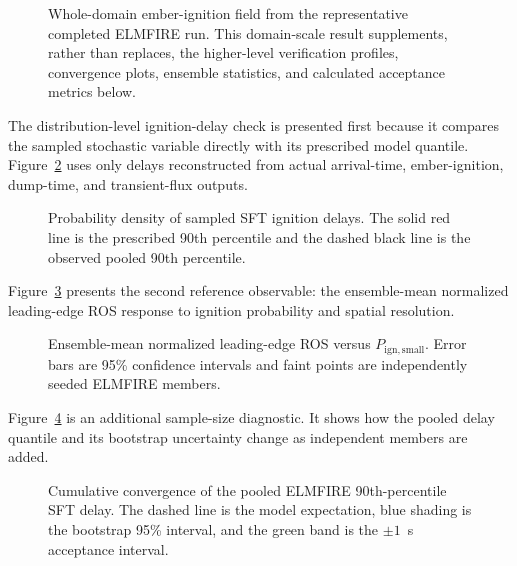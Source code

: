 \begin{figure}[H]
\centering
{}
\caption{Whole-domain ember-ignition field from the representative completed ELMFIRE run.  This
domain-scale result supplements, rather than replaces, the higher-level verification
profiles, convergence plots, ensemble statistics, and calculated acceptance metrics below.}
\label{fig:domain-result}
\end{figure}

The distribution-level ignition-delay check is presented first because it
compares the sampled stochastic variable directly with its prescribed model
quantile. Figure~\ref{fig:delay-distribution} uses only delays reconstructed
from actual arrival-time, ember-ignition, dump-time, and transient-flux outputs.

\begin{figure}[H]
\centering
{}
\caption{Probability density of sampled SFT ignition delays. The solid red line
is the prescribed 90th percentile and the dashed black line is the observed
pooled 90th percentile.}
\label{fig:delay-distribution}
\end{figure}

Figure~\ref{fig:response} presents the second reference observable: the
ensemble-mean normalized leading-edge ROS response to ignition probability and
spatial resolution.

\begin{figure}[H]
\centering
{}
\caption{Ensemble-mean normalized leading-edge ROS versus
$P_{\mathrm{ign,small}}$. Error bars are 95\% confidence intervals and faint
points are independently seeded ELMFIRE members.}
\label{fig:response}
\end{figure}

Figure~\ref{fig:delay} is an additional sample-size diagnostic. It shows how
the pooled delay quantile and its bootstrap uncertainty change as independent
members are added.

\begin{figure}[H]
\centering
{}
\caption{Cumulative convergence of the pooled ELMFIRE 90th-percentile SFT
delay. The dashed line is the model expectation, blue shading is the bootstrap
95\% interval, and the green band is the $\pm1$~s acceptance interval.}
\label{fig:delay}
\end{figure}

